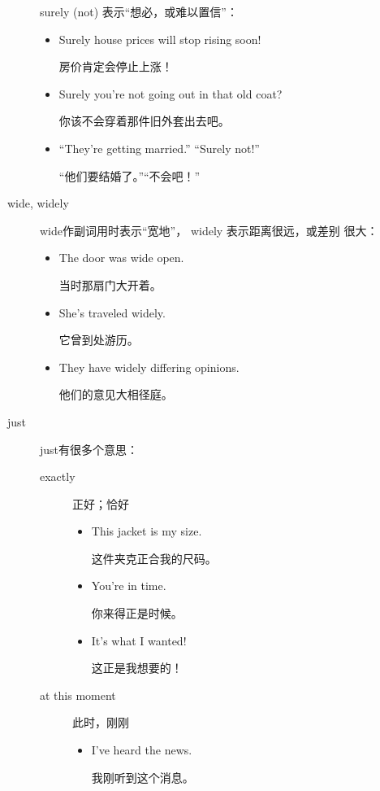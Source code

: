 \begin{description}
surely (not) 表示“想必，或难以置信”：
\begin{itemize}
\item Surely house prices will stop rising soon!

  房价肯定会停止上涨！
\item Surely you're not going out in that old coat?

  你该不会穿着那件旧外套出去吧。

\item ``They're getting married.'' ``Surely not!''

  “他们要结婚了。”“不会吧！”
\end{itemize}

\item[wide, widely] wide作副词用时表示“宽地”， widely 表示距离很远，或差别
  很大：
  \begin{itemize}
  \item The door was wide open.

    当时那扇门大开着。
  \item She's traveled widely.

    它曾到处游历。
  \item They have widely differing opinions.

    他们的意见大相径庭。
  \end{itemize}

\item[just] just有很多个意思：
  \begin{description}
  \item[exactly] 正好；恰好
    \begin{itemize}
    \item This jacket is  my size.

      这件夹克正合我的尺码。

    \item You're  in time.

      你来得正是时候。

    \item It's  what I wanted!

      这正是我想要的！
    \end{itemize}

  \item[at this moment] 此时，刚刚
    \begin{itemize}
    \item I've  heard the news.

      我刚听到这个消息。


\end{itemize}
\end{description}
\end{description}
